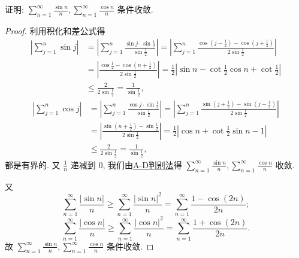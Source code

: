 \documentclass[../../main.tex]{subfiles}%
\begin{document}
\begin{example}
证明: $\sum_{n=1}^{\infty} \frac{\sin n}{n}, \sum_{n=1}^{\infty} \frac{\cos n}{n}$ 条件收敛.
\end{example}
\begin{proof}
利用积化和差公式得
\begin{align*}
\left| \sum_{j=1}^n{\sin j} \right|&=\left| \sum_{j=1}^n{\frac{\sin j\cdot \sin \frac{1}{2}}{\sin \frac{1}{2}}} \right|=\left| \sum_{j=1}^n{\frac{\cos \left( j-\frac{1}{2} \right) -\cos \left( j+\frac{1}{2} \right)}{2\sin \frac{1}{2}}} \right|
\\
&=\left| \frac{\cos \frac{1}{2}-\cos \left( n+\frac{1}{2} \right)}{2\sin \frac{1}{2}} \right|=\frac{1}{2}\left| \sin n-\cot \frac{1}{2}\cos n+\cot \frac{1}{2} \right|
\\
&\leqslant \frac{2}{2\sin \frac{1}{2}}=\frac{1}{\sin \frac{1}{2}},
\end{align*}
\begin{align*}
\left| \sum_{j=1}^n{\cos j} \right|&=\left| \sum_{j=1}^n{\frac{\cos j\cdot \sin \frac{1}{2}}{\sin \frac{1}{2}}} \right|=\left| \sum_{j=1}^n{\frac{\sin \left( j+\frac{1}{2} \right) -\sin \left( j-\frac{1}{2} \right)}{2\sin \frac{1}{2}}} \right|
\\
&=\left| \frac{\sin \left( n+\frac{1}{2} \right) -\sin \frac{1}{2}}{2\sin \frac{1}{2}} \right|=\frac{1}{2}\left| \cos n+\cot \frac{1}{2}\sin n-1 \right|
\\
&\leqslant \frac{2}{2\sin \frac{1}{2}}=\frac{1}{\sin \frac{1}{2}},
\end{align*}
都是有界的. 又 $\frac{1}{n}$ 递减到 0, 我们由\hyperref[theorem:A-D判别法]{A-D判别法}得 $\sum_{n=1}^{\infty} \frac{\sin n}{n}, \sum_{n=1}^{\infty} \frac{\cos n}{n}$ 收敛.

又
\[
\sum_{n=1}^{\infty} \frac{|\sin n|}{n} \geqslant \sum_{n=1}^{\infty} \frac{|\sin n|^2}{n} = \sum_{n=1}^{\infty} \frac{1 - \cos (2n)}{2n};
\]
\[
\sum_{n=1}^{\infty} \frac{|\cos n|}{n} \geqslant \sum_{n=1}^{\infty} \frac{|\cos n|^2}{n} = \sum_{n=1}^{\infty} \frac{1 + \cos (2n)}{2n}.
\]
故 $\sum_{n=1}^{\infty} \frac{\sin n}{n}, \sum_{n=1}^{\infty} \frac{\cos n}{n}$ 条件收敛.
\end{proof}
\end{document}
